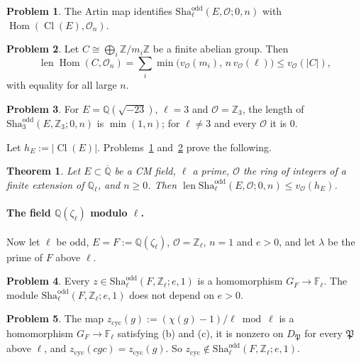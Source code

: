 \documentclass[reqno]{amsart}
\theoremstyle{definition}
\newtheorem{problem}{Problem}[section]
\theoremstyle{plain}
\newtheorem{theorem}{Theorem}[section]
\theoremstyle{remark}
\newcommand{\Z}{\mathbb{Z}}
\newcommand{\Q}{\mathbb{Q}}
\newcommand{\F}{\mathbb{F}}
\newcommand{\Zl}{\Z_\ell}
\newcommand{\Ql}{\Q_\ell}
\newcommand{\Oc}{\mathcal{O}}
\newcommand{\Hom}{\operatorname{Hom}}
\newcommand{\Cl}{\operatorname{Cl}}
\newcommand{\len}{\operatorname{len}}
\newcommand{\Sha}{\mathrm{Sha}}
\newcommand{\Shao}{\Sha^{\mathrm{odd}}}
\begin{document}
\begin{problem}\label{pr:e0-hom}
The Artin map identifies \(\Shao_\ell(E, \Oc; 0, n)\) with \(\Hom(\Cl(E), \Oc_n)\).
\end{problem}

\begin{problem}\label{pr:hom-length}
Let \(C \cong \bigoplus_i \Z/m_i\Z\) be a finite abelian group.  Then
\[
  \len \Hom(C, \Oc_n) = \sum_i \min\bigl(v_\Oc(m_i),\, n\, v_\Oc(\ell)\bigr) \le v_\Oc(\lvert C \rvert) ,
\]
with equality for all large \(n\).
\end{problem}

\begin{problem}\label{pr:e0-example}
For \(E = \Q(\sqrt{-23})\), \(\ell = 3\) and \(\Oc = \Z_3\), the length of \(\Shao_3(E, \Z_3; 0, n)\) is \(\min(1, n)\); for \(\ell \ne 3\) and every \(\Oc\) it is \(0\).
\end{problem}

Let \(h_E := \lvert \Cl(E) \rvert\).  Problems~\ref{pr:e0-hom} and~\ref{pr:hom-length} prove the following.

\begin{theorem}\label{thm:e0}
Let \(E \subset \overline{\Q}\) be a CM field, \(\ell\) a prime, \(\Oc\) the ring of integers of a finite extension of \(\Ql\), and \(n \ge 0\).  Then \(\len \Shao_\ell(E, \Oc; 0, n) \le v_\Oc(h_E)\).
\end{theorem}

\paragraph{The field \(\Q(\zeta_\ell)\) modulo \(\ell\).}
Now let \(\ell\) be odd, \(E = F := \Q(\zeta_\ell)\), \(\Oc = \Zl\), \(n = 1\) and \(e > 0\), and let \(\lambda\) be the prime of \(F\) above \(\ell\).

\begin{problem}\label{pr:F-hom}
Every \(z \in \Shao_\ell(F, \Zl; e, 1)\) is a homomorphism \(G_F \to \F_\ell\).  The module \(\Shao_\ell(F, \Zl; e, 1)\) does not depend on \(e > 0\).
\end{problem}

\begin{problem}\label{pr:F-cyc}
The map \(z_{\mathrm{cyc}}(g) := (\chi(g) - 1)/\ell \bmod \ell\) is a homomorphism \(G_F \to \F_\ell\) satisfying (b) and (c), it is nonzero on \(D_{\mathfrak{P}}\) for every \(\mathfrak{P}\) above \(\ell\), and \(z_{\mathrm{cyc}}(cgc) = z_{\mathrm{cyc}}(g)\).  So \(z_{\mathrm{cyc}} \notin \Shao_\ell(F, \Zl; e, 1)\).
\end{problem}
\end{document}
